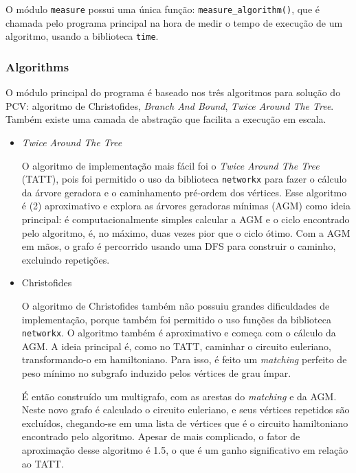 \documentclass{article}
\begin{document}
O módulo \texttt{measure} possui uma única função: \texttt{measure\_algorithm()}, que é chamada pelo programa principal na hora de medir o tempo de execução de um algoritmo, usando a biblioteca \texttt{time}.

\subsubsection{Algorithms}

O módulo principal do programa é baseado nos três algoritmos para solução do PCV: algoritmo de Christofides, \textit{Branch And Bound}, \textit{Twice Around The Tree}. Também existe uma camada de abstração que facilita a execução em escala.

\begin{itemize}

	\item \textit{Twice Around The Tree}

	      O algoritmo de implementação mais fácil foi o \textit{Twice Around The Tree} (TATT), pois foi permitido o uso da biblioteca \texttt{networkx} para fazer o cálculo da árvore geradora e o caminhamento pré-ordem dos vértices. Esse algoritmo é (2) aproximativo e explora as árvores geradoras mínimas (AGM) como ideia principal: é computacionalmente simples calcular a AGM e o ciclo encontrado pelo algoritmo, é, no máximo, duas vezes pior que o ciclo ótimo. Com a AGM em mãos, o grafo é percorrido usando uma DFS para construir o caminho, excluindo repetições.

	\item Christofides

	      O algoritmo de Christofides também não possuiu grandes dificuldades de implementação, porque também foi permitido o uso funções da biblioteca \texttt{networkx}. O algoritmo também é aproximativo e começa com o cálculo da AGM. A ideia principal é, como no TATT, caminhar o circuito euleriano, transformando-o em hamiltoniano. Para isso, é feito um \textit{matching} perfeito de peso mínimo no subgrafo induzido pelos vértices de grau ímpar.

	      É então construído um multigrafo, com as arestas do \textit{matching} e da AGM. Neste novo grafo é calculado o circuito euleriano, e seus vértices repetidos são excluídos, chegando-se em uma lista de vértices que é o circuito hamiltoniano encontrado pelo algoritmo. Apesar de mais complicado, o fator de aproximação desse algoritmo é 1.5, o que é um ganho significativo em relação ao TATT.


\end{itemize}
\end{document}

